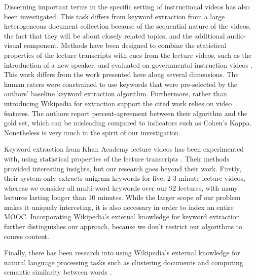 Discerning important terms in the specific setting of instructional
videos has also been investigated. This task differs from keyword
extraction from a large heterogeneous document collection because of
the sequential nature of the videos, the fact that they will be about
closely related topics, and the additional audio-visual
component. Methods have been designed to combine the statistical
properties of the lecture transcripts with cues from the lecture
videos, such as the introduction of a new speaker, and evaluated on
governmental instruction videos \cite{park2006extracting}. This work
differs from the work presented here along several dimensions. The
human raters were constrained to use keywords that were pre-selected
by the authors' baseline keyword extraction algorithm. Furthermore,
rather than introducing Wikipedia for extraction support the cited
work relies on video features. The authors report percent-agreement
between their algorithm and the gold set, which can be misleading
compared to indicators such as Cohen's Kappa. Nonetheless
\cite{park2006extracting} is very much in the spirit of our
investigation. 

Keyword extraction from Khan Academy lecture videos has been experimented with,
using statistical properties of the lecture transcripts \cite{6337092}. Their 
methods provided interesting insights, but our research goes beyond their work.
Firstly, their system only extracts unigram keywords for five, 2-3 minute 
lecture videos, whereas we consider all multi-word keywords over our 92 
lectures, with many lectures lasting longer than 10 minutes. While the larger 
scope of our problem makes it uniquely interesting, it is also necessary in 
order to index an entire MOOC. Incorporating Wikipedia's external knowledge 
for keyword extraction further distinguishes our approach, because we don't 
restrict our algorithms to course content.

Finally, there has been research into using Wikipedia's external knowledge for natural language processing tasks such as clustering documents \cite{hu2009exploiting} and computing semantic similarity between words \cite{milne2007computing}.
